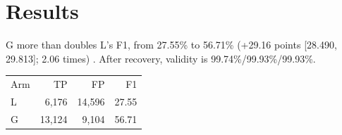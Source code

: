 \section{Results}
G more than doubles L's F1, from 27.55\% to 56.71\% (+29.16 points {[}28.490, 29.813{]}; 2.06 times) \cite{r4}.
After recovery, validity is 99.74\%/99.93\%/99.93\%.
\begin{tabular}{lrrr}
Arm & TP & FP & F1 \\
L & 6,176 & 14,596 & 27.55 \\
G & 13,124 & 9,104 & 56.71 \\
\end{tabular}
